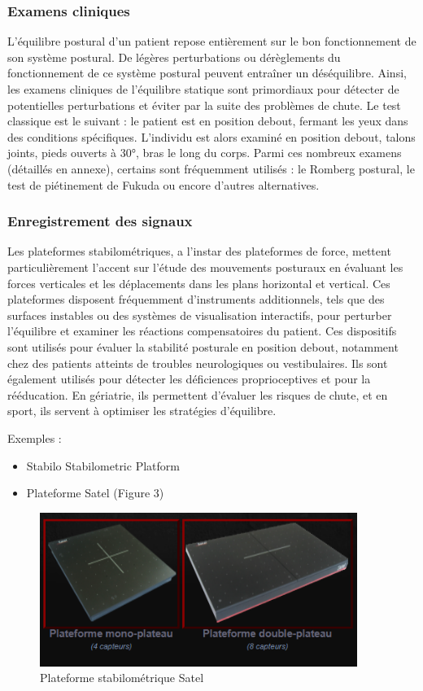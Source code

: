 \subsubsection{Examens cliniques}

L’équilibre postural d’un patient repose entièrement sur le bon fonctionnement de son système postural. 
De légères perturbations ou dérèglements du fonctionnement de ce système postural peuvent  entraîner un déséquilibre. 
Ainsi, les examens cliniques de l’équilibre statique sont primordiaux pour détecter de potentielles perturbations et éviter par la suite des problèmes de chute. 
Le test classique est le suivant :  le patient est en position debout, fermant les yeux dans des conditions spécifiques.  
L’individu est alors examiné en position debout, talons joints, pieds ouverts à 30°, bras le long du corps. 
Parmi ces nombreux examens (détaillés en annexe), certains sont fréquemment utilisés : le Romberg postural, le test de piétinement de Fukuda ou encore d’autres alternatives. 

\subsubsection{Enregistrement des signaux}
Les plateformes stabilométriques, a l’instar des plateformes de force, mettent particulièrement l’accent sur l'étude des mouvements posturaux en évaluant les forces verticales et les déplacements dans les plans horizontal et vertical. 
Ces plateformes disposent fréquemment d’instruments additionnels, tels que des surfaces instables ou des systèmes de visualisation interactifs, pour perturber l'équilibre et examiner les réactions compensatoires du patient. 
Ces dispositifs sont utilisés pour évaluer la stabilité posturale en position debout, notamment chez des patients atteints de troubles neurologiques ou vestibulaires. 
Ils sont également utilisés pour détecter les déficiences proprioceptives et pour la rééducation.
En gériatrie, ils permettent d'évaluer les risques de chute, et en sport, ils servent à optimiser les stratégies d'équilibre. 

Exemples : 
\begin{itemize}
    \item Stabilo Stabilometric Platform 
    \item Plateforme  Satel (Figure 3)
\end{itemize}

\begin{figure}[H]
    \centering
    \includegraphics[height=5cm]{images/pression_plantaire/satel.png}
    \caption{Plateforme stabilométrique Satel}\label{fig:satel}
\end{figure}
 

